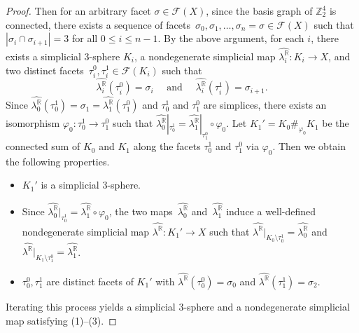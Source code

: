 \documentclass{amsart}
\newcommand{\Z}{\mathbb{Z}}
\newcommand{\R}{\mathbb{R}}
\newcommand{\cF}{\mathcal{F}}
\theoremstyle{definition}
\theoremstyle{remark}
\begin{document}
\begin{proof}
    Then for an arbitrary facet $\sigma\in \cF(X)$, since the basis graph of $\Z_2^4$ is connected, there exists a sequence of facets~$\sigma_0, \sigma_1, \dots, \sigma_n = \sigma\in \cF(X)$ such that $|\sigma_i\cap \sigma_{i+1}| = 3$ for all $0\leq i\leq n-1$. 
    By the above argument, for each $i$, there exists a simplicial 3-sphere $K_i$, a nondegenerate simplicial map $\widehat{{\lambda}_i^\R}\colon K_i\to X$, and two distinct facets~$\tau^0_i, \tau^1_i\in \cF(K_i)$ such that
    $$
        \widehat{\lambda_i^{\R}}(\tau^0_i) = \sigma_i \quad \text{ and }\quad  \widehat{\lambda_i^{\R}}(\tau^1_i) = \sigma_{i+1}.
    $$
    Since $\widehat{\lambda_0^{\R}}(\tau_0^1) = \sigma_1 = \widehat{\lambda_1^{\R}}(\tau_1^0)$ and $\tau_0^1$ and $\tau_1^0$ are simplices, there exists an isomorphism $\varphi_0 \colon \tau_0^1\to \tau_1^0$ such that $\widehat{\lambda_0^{\R}}|_{\tau_0^1} = \widehat{\lambda_1^{\R}}|_{\tau_1^0}\circ \varphi_0$. 
    Let $K_1' = K_0\#_{\varphi_0} K_1$ be the connected sum of $K_0$ and $K_1$ along the facets $\tau_0^1$ and $\tau_1^0$ via $\varphi_0$.
    Then we obtain the following properties.
    \begin{itemize}
        \item $K_1'$ is a simplicial 3-sphere.
        \item Since $\widehat{\lambda_0^{\R}}|_{\tau_0^1} =  \widehat{\lambda_1^{\R}}\circ \varphi_0$, the two maps~$\widehat{\lambda_0^{\R}}$ and~$\widehat{\lambda_1^{\R}}$ induce a well-defined nondegenerate simplicial map $\widehat{\lambda^{\R}} \colon K_1'\to X$ such that $\widehat{\lambda^{\R}}|_{K_0\setminus \tau_0^1} = \widehat{\lambda_0^{\R}}$ and $\widehat{\lambda^{\R}}|_{K_1\setminus \tau_1^0} = \widehat{\lambda_1^{\R}}$. 
        \item $\tau_0^0, \tau_1^1$ are distinct facets of $K_1'$ with $\widehat{\lambda^{\R}}(\tau_0^0) = \sigma_0$ and $\widehat{\lambda^{\R}}(\tau_1^1) = \sigma_2$.
    \end{itemize}
    Iterating this process yields a simplicial 3-sphere and a nondegenerate simplicial map satisfying (1)--(3).
\end{proof}
\end{document}
